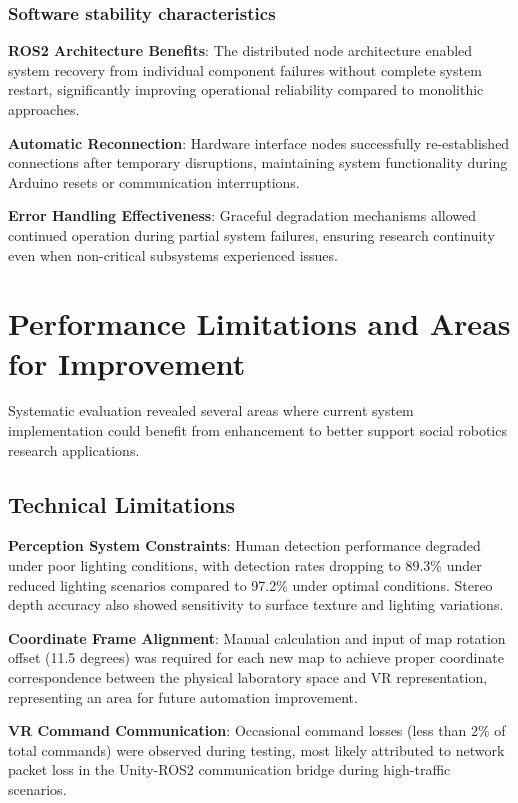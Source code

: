 \subsubsection*{Software stability characteristics}

\textbf{ROS2 Architecture Benefits}: The distributed node architecture enabled system recovery from individual component failures without complete system restart, significantly improving operational reliability compared to monolithic approaches.

\textbf{Automatic Reconnection}: Hardware interface nodes successfully re-established connections after temporary disruptions, maintaining system functionality during Arduino resets or communication interruptions.

\textbf{Error Handling Effectiveness}: Graceful degradation mechanisms allowed continued operation during partial system failures, ensuring research continuity even when non-critical subsystems experienced issues.

\section{Performance Limitations and Areas for Improvement}
\label{sec:limitations}

Systematic evaluation revealed several areas where current system implementation could benefit from enhancement to better support social robotics research applications.

\subsection{Technical Limitations}

\textbf{Perception System Constraints}: Human detection performance degraded under poor lighting conditions, with detection rates dropping to 89.3\% under reduced lighting scenarios compared to 97.2\% under optimal conditions. Stereo depth accuracy also showed sensitivity to surface texture and lighting variations.

\textbf{Coordinate Frame Alignment}: Manual calculation and input of map rotation offset (11.5 degrees) was required for each new map to achieve proper coordinate correspondence between the physical laboratory space and VR representation, representing an area for future automation improvement.

\textbf{VR Command Communication}: Occasional command losses (less than 2\% of total commands) were observed during testing, most likely attributed to network packet loss in the Unity-ROS2 communication bridge during high-traffic scenarios.

